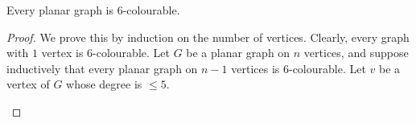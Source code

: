 \begin{thmbox}
    \begin{theorem}
        Every planar graph is $ 6 $-colourable.
    \end{theorem}
\end{thmbox}
\begin{proof}
    We prove this by induction on the number of vertices. Clearly,
    every graph with $ 1 $ vertex is $ 6 $-colourable. Let $ G $
    be a planar graph on $ n $ vertices, and suppose inductively
    that every planar graph on $ n-1 $ vertices is $ 6 $-colourable.
    Let $ v $ be a vertex of $ G $ whose degree is $ \leqslant 5 $.


    \begin{figure}[H]
        \centering
        \begin{tikzpicture}[x=0.75pt,y=0.75pt,yscale=-1,xscale=1]


\end{tikzpicture}
\end{figure}
\end{proof}
